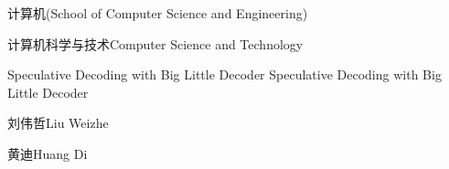 
\school
{计算机}{(School of Computer Science and Engineering)}

\major
{计算机科学与技术}{Computer Science and Technology}

\thesistitle
{Speculative Decoding with Big Little Decoder}
{}
{Speculative Decoding with Big Little Decoder}
{}

\thesisauthor
{刘伟哲}{Liu Weizhe}

\teacher
{黄迪}{Huang Di}






